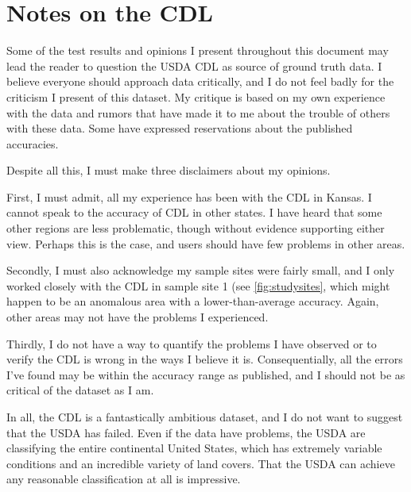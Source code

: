 \chapter{Notes on the CDL}
\label{appendix:cdl}

Some of the test results and opinions I present throughout this document may lead the reader to question the USDA CDL as source of ground truth data. I believe everyone should approach data critically, and I do not feel badly for the criticism I present of this dataset. My critique is based on my own experience with the data and rumors that have made it to me about the trouble of others with these data. Some have expressed reservations about the published accuracies.


Despite all this, I must make three disclaimers about my opinions.

First, I must admit, all my experience has been with the CDL in Kansas. I cannot speak to the accuracy of CDL in other states. I have heard that some other regions are less problematic, though without evidence supporting either view. Perhaps this is the case, and users should have few problems in other areas.

Secondly, I must also acknowledge my sample sites were fairly small, and I only worked closely with the CDL in sample site 1 (see \cref{fig:studysites}, which might happen to be an anomalous area with a lower-than-average accuracy. Again, other areas may not have the problems I experienced.

Thirdly, I do not have a way to quantify the problems I have observed or to verify the CDL is wrong in the ways I believe it is. Consequentially, all the errors I've found may be within the accuracy range as published, and I should not be as critical of the dataset as I am.

In all, the CDL is a fantastically ambitious dataset, and I do not want to suggest that the USDA has failed. Even if the data have problems, the USDA are classifying the entire continental United States, which has extremely variable conditions and an incredible variety of land covers. That the USDA can achieve any reasonable classification at all is impressive.